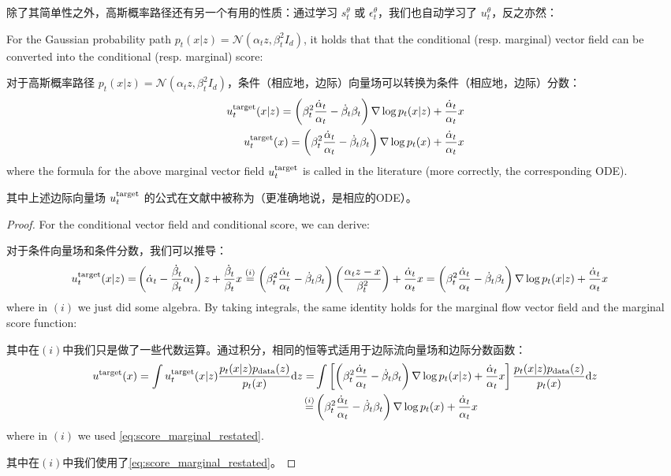 除了其简单性之外，高斯概率路径还有另一个有用的性质：通过学习 $s_t^\theta$ 或 $\epsilon_t^\theta$，我们也自动学习了 $u_t^\theta$，反之亦然：
\begin{proposition}
\label{prop:conversion_formula_gaussian_prob_path}
For the Gaussian probability path $p_t(x|z)=\mathcal{N}(\alpha_t z,\beta_t^2 I_d)$, it holds that that the conditional (resp. marginal) vector field can be converted into the conditional (resp. marginal) score:

对于高斯概率路径 $p_t(x|z)=\mathcal{N}(\alpha_t z,\beta_t^2 I_d)$，条件（相应地，边际）向量场可以转换为条件（相应地，边际）分数：
\begin{align*}
u^{\text{target}}_t(x|z)=\left(\beta_t^2\frac{\dot{\alpha}_t}{\alpha_t}-\dot{\beta}_t\beta_t\right)\nabla\log p_t(x|z)+\frac{\dot{\alpha}_t}{\alpha_t}x\\
u^{\text{target}}_t(x)=\left(\beta_t^2\frac{\dot{\alpha}_t}{\alpha_t}-\dot{\beta}_t\beta_t\right)\nabla\log p_t(x)+\frac{\dot{\alpha}_t}{\alpha_t}x
\end{align*}
where the formula for the above marginal vector field $u^{\text{target}}_t$ is called  in the literature (more correctly, the corresponding ODE).

其中上述边际向量场 $u^{\text{target}}_t$ 的公式在文献中被称为（更准确地说，是相应的ODE）。
\end{proposition}
\begin{proof}
For the conditional vector field and conditional score, we can derive:

对于条件向量场和条件分数，我们可以推导：
\begin{align*}
u^{\text{target}}_t(x|z)=&\left(\dot{\alpha}_t-\frac{\dot{\beta}_t}{\beta_t}\alpha_t\right)z+\frac{\dot{\beta}_t}{\beta_t}x
\overset{(i)}{=}\left(\beta_t^2\frac{\dot{\alpha}_t}{\alpha_t}-\dot{\beta}_t\beta_t\right)\left(\frac{\alpha_tz-x}{\beta_t^2}\right)+\frac{\dot{\alpha}_t}{\alpha_t}x=\left(\beta_t^2\frac{\dot{\alpha}_t}{\alpha_t}-\dot{\beta}_t\beta_t\right)\nabla\log p_t(x|z)+\frac{\dot{\alpha}_t}{\alpha_t}x
\end{align*}
where in $(i)$ we just did some algebra. By taking integrals, the same identity holds for the marginal flow vector field and the marginal score function:

其中在$(i)$中我们只是做了一些代数运算。通过积分，相同的恒等式适用于边际流向量场和边际分数函数：
\begin{align*}
u^{\text{target}}(x)= \int u^{\text{target}}_t(x|z)\frac{ p_t(x|z)p_{\rm{data}}(z)}{p_t(x)}\mathrm{d} z
=&\int\left[\left(\beta_t^2\frac{\dot{\alpha}_t}{\alpha_t}-\dot{\beta}_t\beta_t\right)\nabla\log p_t(x|z)+\frac{\dot{\alpha}_t}{\alpha_t}x\right] \frac{ p_t(x|z)p_{\rm{data}}(z)}{p_t(x)}\mathrm{d} z\\
\overset{(i)}{=}&\left(\beta_t^2\frac{\dot{\alpha}_t}{\alpha_t}-\dot{\beta}_t\beta_t\right)\nabla\log p_t(x)+\frac{\dot{\alpha}_t}{\alpha_t}x
\end{align*}
where in $(i)$ we used \cref{eq:score_marginal_restated}.

其中在$(i)$中我们使用了\cref{eq:score_marginal_restated}。
\end{proof}
